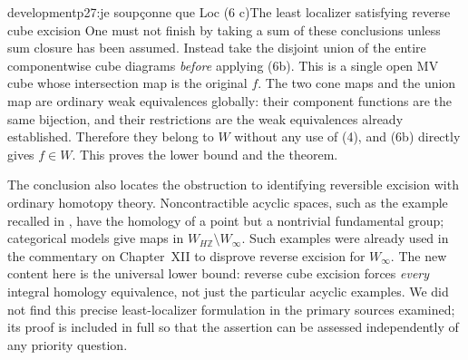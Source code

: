 \begin{dcomment}{development}{p27:je soupçonne que Loc (6 c)}{The least localizer satisfying reverse cube excision}
One must not finish by taking a sum of these conclusions unless sum closure has been assumed. Instead take the disjoint union of the entire componentwise cube diagrams \emph{before} applying (6b). This is a single open MV cube whose intersection map is the original $f$. The two cone maps and the union map are ordinary weak equivalences globally: their component functions are the same bijection, and their restrictions are the weak equivalences already established. Therefore they belong to $W$ without any use of (4), and (6b) directly gives $f\in W$. This proves the lower bound and the theorem.

The conclusion also locates the obstruction to identifying reversible excision with ordinary homotopy theory. Noncontractible acyclic spaces, such as the example recalled in \citet[discussion following Corollary 4.33, p.~368]{Hatcher2002}, have the homology of a point but a nontrivial fundamental group; categorical models give maps in $W_{H\mathbb Z}\setminus W_\infty$. Such examples were already used in the commentary on Chapter~XII to disprove reverse excision for $W_\infty$. The new content here is the universal lower bound: reverse cube excision forces \emph{every} integral homology equivalence, not just the particular acyclic examples. We did not find this precise least-localizer formulation in the primary sources examined; its proof is included in full so that the assertion can be assessed independently of any priority question.
\end{dcomment}


